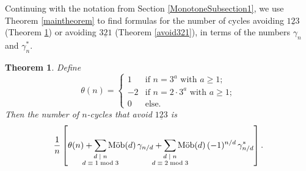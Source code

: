 \documentclass[12pt]{article}
\DeclareMathOperator{\mob}{M\ddot{o}b}
\newcommand{\gam}{\gamma}
\newcommand{\ee}{\chi}
\newtheorem{thm}{Theorem}[section]
\theoremstyle{definition}
\begin{document}

Continuing with the notation from Section \ref{MonotoneSubsection1}, we use Theorem \ref{maintheorem} to find formulas for the number of cycles avoiding $\underline{123}$ (Theorem \ref{avoid123}) or avoiding $\underline{321}$ (Theorem \ref{avoid321}), in terms of the numbers $\gam_n$ and $\gam_n^*$.

\begin{thm} \label{avoid123} Define
\[ \theta(n) = \begin{cases}
1 & \text{if $n = 3^a$ with $a \ge 1$}; \\
-2 & \text{if $n = 2 \cdot 3^a$ with $a \ge 1$}; \\
0 & \text{else}.
\end{cases} \]
Then the number of $n$-cycles that avoid $\underline{123}$ is
\[ \frac{1}{n} \left[ \theta(n) + \sum_{\mathclap{\substack{\text{$d \mid n$}\\ \text{$d \equiv 1\bmod 3$}}}} \mob(d)\, \gam_{n/d} + \sum_{\mathclap{\substack{\text{$d \mid n$}\\ \text{$d \equiv 2\bmod 3$}}}} \mob(d)\, (-1)^{n/d}\, \gam_{n/d}^*\right]. \]
\end{thm}
\end{document}
